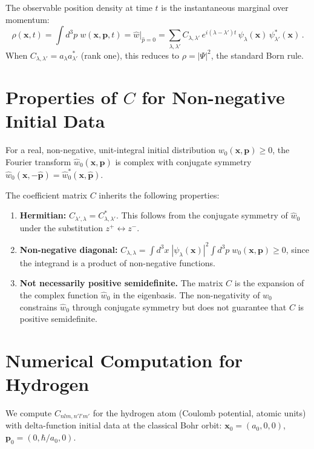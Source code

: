 \documentclass[12pt]{article}
\begin{document}
The observable position density at time $t$ is the instantaneous marginal over momentum:
\begin{equation}\label{eq:born}
\rho(\mathbf{x},t) = \int d^3p\; w(\mathbf{x},\mathbf{p},t) = \hat{w}\big|_{\hat{p}=0} = \sum_{\lambda,\lambda'} C_{\lambda,\lambda'}\, e^{i(\lambda-\lambda')t}\, \psi_\lambda(\mathbf{x})\, \psi^*_{\lambda'}(\mathbf{x}) \,.
\end{equation}
When $C_{\lambda,\lambda'} = a_\lambda a^*_{\lambda'}$ (rank one), this reduces to $\rho = |\Psi|^2$, the standard Born rule.

\section{Properties of $C$ for Non-negative Initial Data}

For a real, non-negative, unit-integral initial distribution $w_0(\mathbf{x},\mathbf{p}) \geq 0$, the Fourier transform $\hat{w}_0(\mathbf{x},\hat{\mathbf{p}})$ is complex with conjugate symmetry $\hat{w}_0(\mathbf{x},-\hat{\mathbf{p}}) = \hat{w}_0^*(\mathbf{x},\hat{\mathbf{p}})$.

The coefficient matrix $C$ inherits the following properties:
\begin{enumerate}
\item \textbf{Hermitian:} $C_{\lambda',\lambda} = C^*_{\lambda,\lambda'}$.  This follows from the conjugate symmetry of $\hat{w}_0$ under the substitution $z^+ \leftrightarrow z^-$.
\item \textbf{Non-negative diagonal:}  $C_{\lambda,\lambda} = \int d^3x\; |\psi_\lambda(\mathbf{x})|^2 \int d^3p\; w_0(\mathbf{x},\mathbf{p}) \geq 0$, since the integrand is a product of non-negative functions.
\item \textbf{Not necessarily positive semidefinite.}  The matrix $C$ is the expansion of the complex function $\hat{w}_0$ in the eigenbasis.  The non-negativity of $w_0$ constrains $\hat{w}_0$ through conjugate symmetry but does not guarantee that $C$ is positive semidefinite.
\end{enumerate}

\section{Numerical Computation for Hydrogen}

We compute $C_{nlm,n'l'm'}$ for the hydrogen atom (Coulomb potential, atomic units) with delta-function initial data at the classical Bohr orbit: $\mathbf{x}_0 = (a_0, 0, 0)$, $\mathbf{p}_0 = (0, \hbar/a_0, 0)$.
\end{document}
